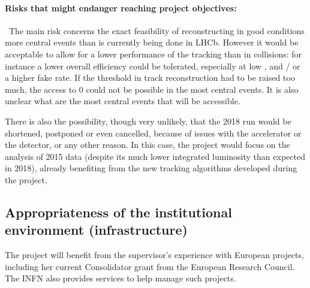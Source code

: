 \documentclass[a4paper,11pt]{article}
\newcommand{\supervisor}{the supervisor}
\begin{document}
\paragraph{Risks that might endanger reaching project objectives: }\
The main risk concerns the exact feasibility of reconstructing in good conditions more central events than is currently being done in LHCb. However it would be acceptable to allow for a lower performance of the tracking than in \pp collisions: for instance a lower overall efficiency could be tolerated, especially at low \pt, and / or a higher fake rate. If the \pt threshold in track reconstruction had to be raised too much, the access to 0 \pt \Dz could not be possible in the most central events. It is also unclear what are the most central events that will be accessible. 

There is also the possibility, though very unlikely, that the 2018 \pbpb run would be shortened, postponed or even cancelled, because of issues with the accelerator or the detector, or any other reason. In this case, the project would focus on the analysis of 2015 \pbpb data (despite its much lower integrated luminosity than expected in 2018), already benefiting from the new tracking algorithms developed during the project.

%      
%      
\subsection{Appropriateness of the institutional environment (infrastructure)}


The project will benefit from \supervisor's experience with European projects, including her current Consolidator grant from the European Research Council. The INFN also provides services to help manage such projects.
\end{document}
